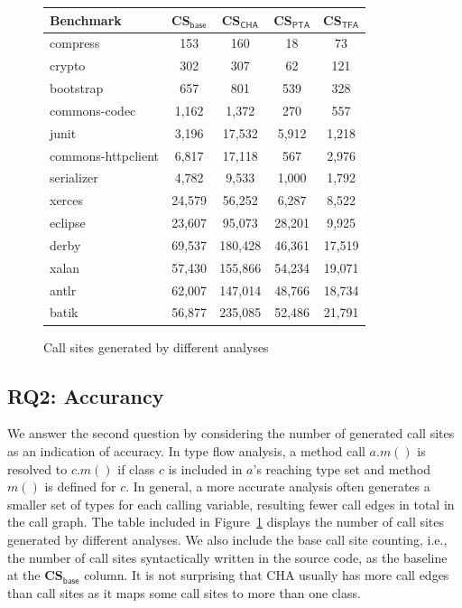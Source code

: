 \documentclass[runningheads]{llncs}
\begin{document}
\begin{figure}[t!]
  \centering
\begin{tabular}{lcccc}
	\hline
	\textbf{Benchmark} &\hspace{5pt} \textbf{CS$_{\textsf{base}}$} &\hspace{5pt} \textbf{CS$_{\textsf{CHA}}$}\hspace{5pt} &\hspace{5pt} \textbf{CS$_{\textsf{PTA}}$}\hspace{5pt} & \hspace{5pt} \textbf{CS$_{\textsf{TFA}}$}\hspace{5pt} \\
	\hline
	compress & 153 & 160 & 18 & 73 \\
	crypto & 302 & 307 & 62 & 121 \\
	bootstrap & 657 & 801 & 539 & 328 \\
	commons-codec & 1,162 & 1,372 & 270 & 557 \\
	junit & 3,196 & 17,532 & 5,912 & 1,218 \\
	commons-httpclient & 6,817 & 17,118 & 567 & 2,976 \\
	serializer & 4,782 & 9,533 & 1,000 & 1,792 \\
	xerces & 24,579 & 56,252 & 6,287 & 8,522 \\
	eclipse & 23,607 & 95,073 & 28,201 & 9,925 \\
	derby & 69,537 & 180,428 & 46,361 & 17,519 \\
	xalan & 57,430 & 155,866 & 54,234 & 19,071 \\
	antlr & 62,007 & 147,014 & 48,766 & 18,734 \\
	batik & 56,877 & 235,085 & 52,486 & 21,791 \\
	\hline
\end{tabular}
\caption{Call sites generated by different analyses}
\label{experiment:Callsite}
\end{figure}

\subsection{RQ2: Accurancy}\label{subsec:accurancy}

We answer the second question by considering the number of generated call sites as an indication of accuracy. In type flow analysis, a method call $a.m()$ is resolved to $c.m()$ if class $c$ is included in $a$'s reaching type set and method $m()$ is defined for $c$. In general, a more accurate analysis often generates a smaller set of types for each calling variable, resulting fewer call edges in total in the call graph. The table included in Figure~\ref{experiment:Callsite} displays the number of call sites generated by different analyses. We also include the base call site counting, i.e., the number of call sites syntactically written in the source code, as the baseline at the \textbf{CS$_{\textsf{base}}$} column. It is not surprising that CHA usually has more call edges than call sites as it maps some call sites to more than one class.
\end{document}
